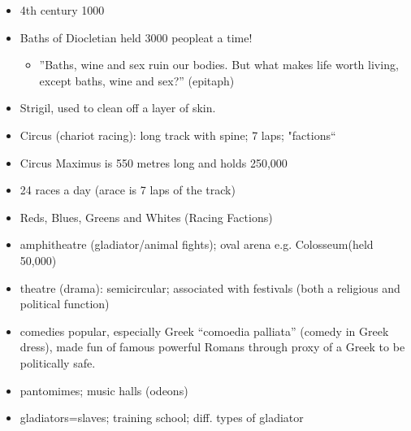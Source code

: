 \documentclass[12pt, twoside]{article}
\begin{document}
\begin{itemize}
\item 4th century 1000
\item Baths of Diocletian held 3000 peopleat a time!
	\begin{itemize}
	\item ”Baths, wine and sex ruin our bodies. But what makes life worth living, except baths, wine and sex?” (epitaph)
	\end{itemize}
\item Strigil, used to clean off a layer of skin.
\item Circus (chariot racing): long track with spine; 7 laps; "factions“
\item Circus Maximus is 550 metres long and holds 250,000
\item 24 races a day (arace is 7 laps of the track)
\item Reds, Blues, Greens and Whites (Racing Factions)
\item amphitheatre (gladiator/animal fights); oval arena e.g. Colosseum(held 50,000)
\item theatre (drama): semicircular; associated with festivals (both a religious and political function)
\item comedies popular, especially Greek “comoedia palliata” (comedy in Greek dress), made fun of famous powerful Romans through proxy of a Greek to be politically safe.
\item pantomimes; music halls (odeons)
\item gladiators=slaves; training school; diff. types of gladiator
\end{itemize}
\end{document}
